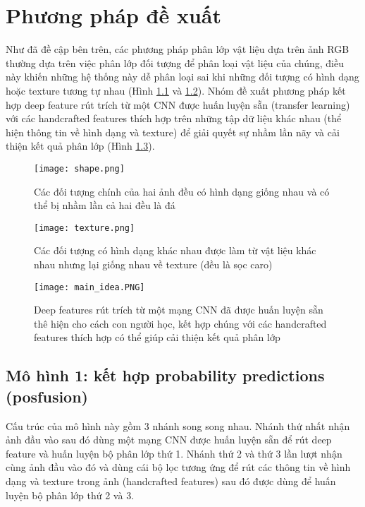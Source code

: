 \chapter{Phương pháp đề xuất}
\ifpdf
    \graphicspath{{Chapter4/Chapter4Figs/PNG/}{Chapter4/Chapter4Figs/PDF/}{Chapter4/Chapter4Figs/}}
\else
    \graphicspath{{Chapter4/Chapter4Figs/EPS/}{Chapter4/Chapter4Figs/}}
\fi

Như đã đề cập bên trên, các phương pháp phân lớp vật liệu dựa trên ảnh RGB thường dựa trên việc phân lớp đối tượng để phân loại vật liệu của chúng, điều này khiến những hệ thống này dễ phân loại sai khi những đối tượng có hình dạng hoặc texture tương tự nhau (Hình \ref{fig:shape} và \ref{fig:texture}). Nhóm đề xuất phương pháp kết hợp deep feature rút trích từ một CNN được huấn luyện sẵn (transfer learning) với các handcrafted features thích hợp trên những tập dữ liệu khác nhau (thể hiện thông tin về hình dạng và texture) để giải quyết sự nhầm lần nãy và cải thiện kết quả phân lớp (Hình \ref{fig:main_idea}). 

\begin{figure}[h!]
	\centering
	\captionsetup{width=0.75\textwidth}
	\texttt{[image: shape.png]}
	\caption{Các đối tượng chính của hai ảnh đều có hình dạng giống nhau và có thể bị nhầm lần cả hai đều là đá}
    \label{fig:shape}
\end{figure}

\begin{figure}[h!]
	\centering
	\captionsetup{width=0.75\textwidth}
	\texttt{[image: texture.png]}
	\caption{Các đối tượng có hình dạng khác nhau được làm từ vật liệu khác nhau nhưng lại giống nhau về texture (đều là sọc caro)}
    \label{fig:texture}
\end{figure}

\begin{figure}[h!]
	\centering
	\captionsetup{width=0.7\textwidth}
	\texttt{[image: main\_idea.PNG]}
	\caption{Deep features rút trích từ một mạng CNN đã được huấn luyện sẵn thê hiện cho cách con người học, kết hợp chúng với các handcrafted features thích hợp có thể giúp cải thiện kết quả phân lớp}
    \label{fig:main_idea}
\end{figure}

\section{Mô hình 1: kết hợp probability predictions (posfusion)}
Cấu trúc của mô hình này gồm 3 nhánh song song nhau. Nhánh thứ nhất nhận ảnh đầu vào sau đó dùng một mạng CNN được huấn luyện sẵn để rút deep feature và huấn luyện bộ phân lớp thứ 1. Nhánh thứ 2 và thứ 3 lần lượt nhận cùng ảnh đầu vào đó và dùng cái bộ lọc tương ứng để rút các thông tin về hình dạng và texture trong ảnh (handcrafted features) sau đó được dùng để huấn luyện bộ phân lớp thứ 2 và 3. 

